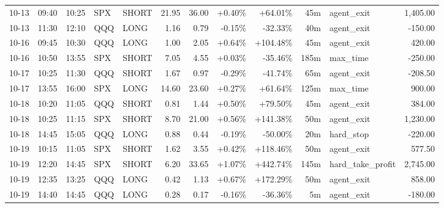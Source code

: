 \documentclass[11pt,a4paper,twoside]{article}
\begin{document}
\begin{center}
\begin{longtable}{>{\color{txtmain}}l l l l l r r r r r >{\color{txtmain}}l r}
10-13 & 09:40 & 10:25 & SPX & SHORT & 21.95 & 36.00 & \textcolor{wingreen}{+0.40\%} & \textcolor{wingreen}{+64.01\%} & 45m & agent\_exit & \textcolor{wingreen}{1,405.00} \\
10-13 & 11:30 & 12:10 & QQQ & LONG & 1.16 & 0.79 & \textcolor{lossred}{-0.15\%} & \textcolor{lossred}{-32.33\%} & 40m & agent\_exit & \textcolor{lossred}{-150.00} \\
10-16 & 09:45 & 10:30 & QQQ & LONG & 1.00 & 2.05 & \textcolor{wingreen}{+0.64\%} & \textcolor{wingreen}{+104.48\%} & 45m & agent\_exit & \textcolor{wingreen}{420.00} \\
10-16 & 10:50 & 13:55 & SPX & SHORT & 7.05 & 4.55 & \textcolor{wingreen}{+0.03\%} & \textcolor{lossred}{-35.46\%} & 185m & max\_time & \textcolor{lossred}{-250.00} \\
10-17 & 10:25 & 11:30 & QQQ & SHORT & 1.67 & 0.97 & \textcolor{lossred}{-0.29\%} & \textcolor{lossred}{-41.74\%} & 65m & agent\_exit & \textcolor{lossred}{-208.50} \\
10-17 & 13:55 & 16:00 & SPX & LONG & 14.60 & 23.60 & \textcolor{wingreen}{+0.27\%} & \textcolor{wingreen}{+61.64\%} & 125m & max\_time & \textcolor{wingreen}{900.00} \\
10-18 & 10:20 & 11:05 & QQQ & SHORT & 0.81 & 1.44 & \textcolor{wingreen}{+0.50\%} & \textcolor{wingreen}{+79.50\%} & 45m & agent\_exit & \textcolor{wingreen}{384.00} \\
10-18 & 10:25 & 11:15 & SPX & SHORT & 8.70 & 21.00 & \textcolor{wingreen}{+0.56\%} & \textcolor{wingreen}{+141.38\%} & 50m & agent\_exit & \textcolor{wingreen}{1,230.00} \\
10-18 & 14:45 & 15:05 & QQQ & LONG & 0.88 & 0.44 & \textcolor{lossred}{-0.19\%} & \textcolor{lossred}{-50.00\%} & 20m & hard\_stop & \textcolor{lossred}{-220.00} \\
10-19 & 10:15 & 11:05 & SPX & SHORT & 1.62 & 3.55 & \textcolor{wingreen}{+0.42\%} & \textcolor{wingreen}{+118.46\%} & 50m & agent\_exit & \textcolor{wingreen}{577.50} \\
10-19 & 12:20 & 14:45 & SPX & SHORT & 6.20 & 33.65 & \textcolor{wingreen}{+1.07\%} & \textcolor{wingreen}{+442.74\%} & 145m & hard\_take\_profit & \textcolor{wingreen}{2,745.00} \\
10-19 & 12:35 & 13:25 & QQQ & LONG & 0.42 & 1.13 & \textcolor{wingreen}{+0.67\%} & \textcolor{wingreen}{+172.29\%} & 50m & agent\_exit & \textcolor{wingreen}{858.00} \\
10-19 & 14:40 & 14:45 & QQQ & LONG & 0.28 & 0.17 & \textcolor{lossred}{-0.16\%} & \textcolor{lossred}{-36.36\%} & 5m & agent\_exit & \textcolor{lossred}{-180.00} \\

\end{longtable}
\end{center}
\end{document}
